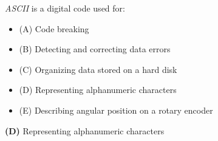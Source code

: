 

{\it ASCII} is a digital code used for:

\begin{itemize}
\item{(A)} Code breaking
\vskip 5pt 
\item{(B)} Detecting and correcting data errors
\vskip 5pt 
\item{(C)} Organizing data stored on a hard disk
\vskip 5pt 
\item{(D)} Representing alphanumeric characters
\vskip 5pt 
\item{(E)} Describing angular position on a rotary encoder
\end{itemize}







{\bf (D)} Representing alphanumeric characters
 










